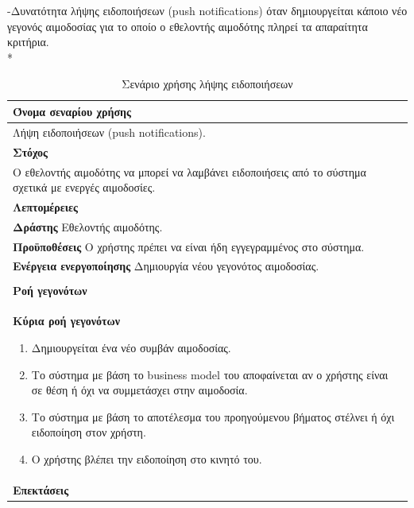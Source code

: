 -Δυνατότητα λήψης ειδοποιήσεων (push notifications) όταν δημιουργείται κάποιο νέο γεγονός αιμοδοσίας για το οποίο ο εθελοντής αιμοδότης πληρεί τα απαραίτητα κριτήρια.
\\*
\begin{table}[H]
	\begin{center}
	    \begin{tabular}{|p{\dimexpr \linewidth-2\tabcolsep}|}
	    \hline
	    \rowcolor{grayy}
	    \textbf{Όνομα σεναρίου χρήσης}
	    \\ \hline    
	     Λήψη ειδοποιήσεων (push notifications).
	     \\ \hline
	    \rowcolor{grayy}
	    \textbf{\textbf{Στόχος}}
	    \\ \hline
	 	 Ο εθελοντής αιμοδότης να μπορεί να λαμβάνει ειδοποιήσεις από το σύστημα σχετικά με ενεργές αιμοδοσίες. 
	    \\ \hline
	    \rowcolor{grayy}
	    \textbf{Λεπτομέρειες}
	    \\ \hline
		\textbf{Δράστης} Εθελοντής αιμοδότης.
		\\*
		\textbf{Προϋποθέσεις} Ο χρήστης πρέπει να είναι ήδη εγγεγραμμένος στο σύστημα.
		\\*
		\textbf{Ενέργεια ενεργοποίησης} Δημιουργία νέου γεγονότος αιμοδοσίας.
		\\ \hline
	    \\ \hline
		\rowcolor{grayy}    
	    \textbf{Ροή γεγονότων}
	    \\* 
		\textbf{Κύρια ροή γεγονότων}
		\begin{enumerate}
			\item	Δημιουργείται ένα νέο συμβάν αιμοδοσίας.
			\item Το σύστημα με βάση το business model του αποφαίνεται αν ο χρήστης είναι σε θέση ή όχι να συμμετάσχει στην αιμοδοσία.
			\item Το σύστημα με βάση το αποτέλεσμα του προηγούμενου βήματος στέλνει ή όχι ειδοποίηση στον χρήστη.
			\item Ο χρήστης βλέπει την ειδοποίηση στο κινητό του.
		\end{enumerate}
		\\*
		\textbf{Επεκτάσεις}
		   \\ \hline
	    \end{tabular}
	    \caption{Σενάριο χρήσης λήψης ειδοποιήσεων}
	    \label{tab:receive_push_notifications} 
	\end{center}
\end{table}

